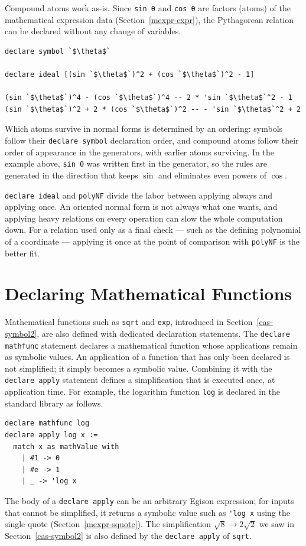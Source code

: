 Compound atoms work as-is.
Since \lstinline{sin θ} and \lstinline{cos θ} are factors (atoms) of the mathematical expression data (Section~\ref{mexpr-expr}), the Pythagorean relation can be declared without any change of variables.
\begin{lstlisting}[language=egison,numbers=none]
declare symbol `$\theta$`

declare ideal [(sin `$\theta$`)^2 + (cos `$\theta$`)^2 - 1]

(sin `$\theta$`)^4 - (cos `$\theta$`)^4 -- 2 * 'sin `$\theta$`^2 - 1
(sin `$\theta$`)^2 + 2 * (cos `$\theta$`)^2 -- - 'sin `$\theta$`^2 + 2
\end{lstlisting}
Which atoms survive in normal forms is determined by an ordering: symbols follow their \lstinline{declare symbol} declaration order, and compound atoms follow their order of appearance in the generators, with earlier atoms surviving.
In the example above, \lstinline{sin θ} was written first in the generator, so the rules are generated in the direction that keeps $\sin$ and eliminates even powers of $\cos$.

\lstinline{declare ideal} and \lstinline{polyNF} divide the labor between applying always and applying once.
An oriented normal form is not always what one wants, and applying heavy relations on every operation can slow the whole computation down.
For a relation used only as a final check --- such as the defining polynomial of a coordinate --- applying it once at the point of comparison with \lstinline{polyNF} is the better fit.

\section{Declaring Mathematical Functions}\label{casdetail-mathfunc}

Mathematical functions such as \lstinline{sqrt} and \lstinline{exp}, introduced in Section~\ref{cas-symbol2}, are also defined with dedicated declaration statements.
The \lstinline{declare mathfunc} statement declares a mathematical function whose applications remain as symbolic values.
An application of a function that has only been declared is not simplified; it simply becomes a symbolic value.
Combining it with the \lstinline{declare apply} statement defines a simplification that is executed once, at application time.
For example, the logarithm function \lstinline{log} is declared in the standard library as follows.
\begin{lstlisting}[language=egison,numbers=none]
declare mathfunc log
declare apply log x :=
  match x as mathValue with
    | #1 -> 0
    | #e -> 1
    | _ -> 'log x
\end{lstlisting}
The body of a \lstinline{declare apply} can be an arbitrary Egison expression; for inputs that cannot be simplified, it returns a symbolic value such as \lstinline{'log x} using the single quote (Section~\ref{mexpr-squote}).
The simplification $\sqrt{8} \rightarrow 2\sqrt{2}$ we saw in Section~\ref{cas-symbol2} is also defined by the \lstinline{declare apply} of \lstinline{sqrt}.

